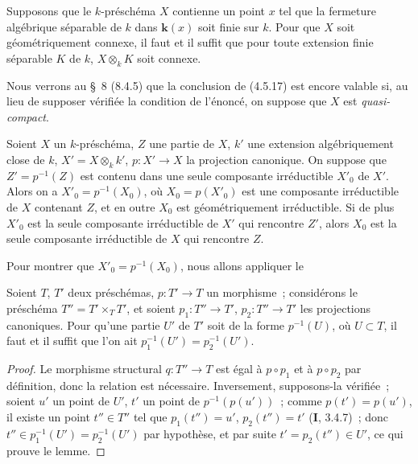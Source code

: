 
\begin{corollary}[4.5.17]
\label{IV.2.4.5.17-fr}
Supposons que le $k$-préschéma $X$ contienne un point $x$ tel que la fermeture
algébrique séparable de $k$ dans $\boldsymbol{k}(x)$ soit finie sur $k$. Pour que $X$ soit
géométriquement connexe, il faut et il suffit que pour toute extension finie
séparable $K$ de $k$, $X\otimes_k K$ soit connexe.
\end{corollary}

\begin{remark}[4.5.18]
\label{IV.2.4.5.18-fr}
Nous verrons au \S~8 (8.4.5) que la conclusion de (4.5.17) est encore valable
si, au lieu de supposer vérifiée la condition de l'énoncé, on suppose que $X$
est \emph{quasi-compact}.
\end{remark}

\begin{proposition}[4.5.19]
Soient $X$ un $k$-préschéma, $Z$ une partie de $X$, $k'$ une extension
algébriquement close de $k$, $X'=X\otimes_k k'$, $p:X'\to X$ la projection
canonique. On suppose que $Z'=p^{-1}(Z)$ est contenu dans \textup{une seule} composante
irréductible $X'_0$ de $X'$. Alors on a $X'_0=p^{-1}(X_0)$, où
$X_0=p(X'_0)$ est une composante irréductible de $X$ contenant $Z$, et en outre
$X_0$ est géométriquement irréductible. Si de plus $X'_0$ est la seule
composante irréductible de $X'$ qui \textup{rencontre} $Z'$, alors $X_0$ est la seule
composante irréductible de $X$ qui rencontre $Z$.
\end{proposition}

Pour montrer que $X'_0=p^{-1}(X_0)$, nous allons appliquer le

\begin{lemma}[4.5.19.1]
\label{IV.2.4.5.19.1-fr}
Soient $T$, $T'$ deux préschémas, $p:T'\to T$ un morphisme~; considérons le
préschéma $T''=T'\times_T T'$, et soient $p_1:T''\to T'$, $p_2:T''\to T'$ les
projections canoniques. Pour qu'une partie $U'$ de $T'$ soit de la forme
$p^{-1}(U)$, où $U\subset T$, il faut et il suffit que l'on ait
$p_1^{-1}(U')=p_2^{-1}(U')$.
\end{lemma}

\begin{proof}
Le morphisme structural $q:T''\to T$ est égal à $p\circ p_1$ et à
$p\circ p_2$ par définition, donc la relation est nécessaire. Inversement,
supposons-la vérifiée~; soient $u'$ un point de $U'$, $t'$ un point de
$p^{-1}(p(u'))$~; comme $p(t')=p(u')$, il existe un point $t''\in T''$ tel que
$p_1(t'')=u'$, $p_2(t'')=t'$ (\textbf{I}, 3.4.7)~; donc
$t''\in p_1^{-1}(U')=p_2^{-1}(U')$ par hypothèse, et par suite
$t'=p_2(t'')\in U'$, ce qui prouve le lemme.
\end{proof}

